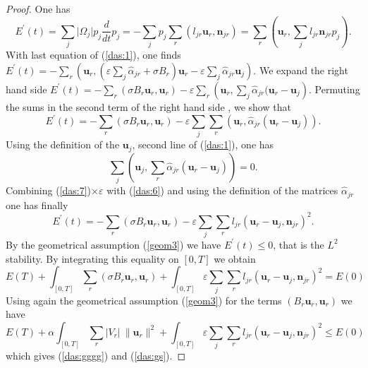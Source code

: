 \documentclass[a4paper,french,english,10pt]{article}
\newcommand\ljr{l_{jr}}
\newcommand\njr{\mathbf{n}_{jr}}
\newcommand\uu{\mathbf{u}}
\newcommand\eps{\varepsilon}
\newcommand\alj{\widehat{\alpha}_{jr}}
\newcommand\uj{\uu_j}
\newcommand\ur{\uu_r}
\begin{document}
\begin{proof}
One has
$$
E^{'}(t)= \sum_j \vert \Omega_j\vert p_j \frac{d}{dt}p_j
= -\sum_j  p_j \sum_{r}(l_{jr}\ur,\njr) 
 =\sum_r \left (\uu_r, \sum_{j}l_{jr}\njr p_j\right ) .
$$
 With  last equation of (\ref{das:1}),  one finds
$
E^{'}(t)= -\sum_r \left (\uu_r, \left( \eps\sum_{j}\alj+ 
\sigma B_r\right)\ur-
\eps\sum_j\alj\uj\right )
$. %
We expand the right hand side  %
$E^{'}(t)= -\sum_r \left (\sigma B_r \uu_r, \uu_r\right ) 
-\eps \sum_r\left( \uu_r, \sum_j \alj(\uu_r -\uu_j\right )$.
Permuting the sums in the second term of the right hand side , we show that
\begin{equation}\label{das:6}
E^{'}(t)= -\sum_r \left (\sigma B_r \uu_r, \uu_r\right ) 
-\eps\sum_j\sum_r \left( \uu_r,  \alj(\uu_r -\uu_j)\right ).
\end{equation}
Using the definition of the $\uu_j$, second line of (\ref{das:1}), one has
\begin{equation}\label{das:7}
\sum_j 
\left( \uu_j,  \sum_r \alj(\uu_r -\uu_j)\right)=0. 
\end{equation}
Combining (\ref{das:7})$\times \eps$  with (\ref{das:6}) and using the definition of
the matrices $\alj$ one has finally
\begin{equation*}\label{das:8}
E^{'}(t)= -\sum_r \left (\sigma B_r \uu_r, \uu_r\right ) 
-\eps\sum_j\sum_r \ljr \left( \uu_r- \uu_j,  \njr\right )^2.
\end{equation*}
By the geometrical assumption  (\ref{geom3}) we have $E^{'}(t)\leq 0$, that is
the $L^2$ stability.
By integrating this equality on $[0,T]$ we obtain
\begin{equation*}\label{eq:ds5bis}
\displaystyle
E(T) + \int_{[0,T]}\sum_r \left (\sigma B_r \uu_r, \uu_r\right ) 
 +\int_{[0,T]}\eps\sum_j\sum_r \ljr \left( \uu_r- \uu_j,  \njr\right )^2=E(0)
\end{equation*}
Using again the geometrical assumption  (\ref{geom3}) for the terms
$(B_r\ur,\ur)$ we have
\begin{equation*}\label{eq:ds6bis}
E(T) + \alpha \int_{[0,T]}\sum_r  \vert V_r\vert \  \| \uu_r \|^2 
+ \int_{[0,T]}\eps\sum_j\sum_r \ljr \left( \uu_r- \uu_j,  \njr\right )^2\leq
E(0)
\end{equation*}
which gives (\ref{das:gggg}) and (\ref{das:gs}).
\end{proof}
\end{document}
